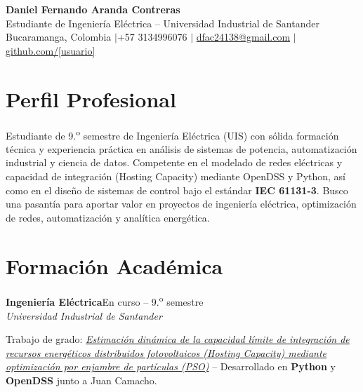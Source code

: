 \documentclass[10pt,a4paper]{article}
\newcommand{\entrada}[3]{%
    \noindent\textbf{\color{primario}#1}\hfill{\small\color{secundario}#2}\\[0pt]
    {\small\itshape\color{secundario}#3}\par\vspace{1pt}%
}
\begin{document}

\vspace{-10pt}
\begin{center}
    {\fontsize{21}{24}\selectfont\bfseries\color{primario} Daniel Fernando Aranda Contreras}\\[2pt]
    {\normalsize\color{secundario} Estudiante de Ingeniería Eléctrica -- Universidad Industrial de Santander}\\[4pt]
    {\small\color{texto}
        Bucaramanga, Colombia \quad$\vert$\quad +57 3134996076 \quad$\vert$\quad
        \href{mailto:dfac24138@gmail.com}{dfac24138@gmail.com} \quad$\vert$\quad
        \href{https://github.com/[usuario]}{github.com/[usuario]}
    }
\end{center}
\vspace{0pt}

\section*{Perfil Profesional}
Estudiante de 9.\textsuperscript{o} semestre de Ingeniería Eléctrica (UIS) con sólida formación técnica y experiencia práctica en análisis de sistemas de potencia, automatización industrial y ciencia de datos. Competente en el modelado de redes eléctricas y capacidad de integración (Hosting Capacity) mediante OpenDSS y Python, así como en el diseño de sistemas de control bajo el estándar \textbf{IEC 61131-3}. Busco una pasantía para aportar valor en proyectos de ingeniería eléctrica, optimización de redes, automatización y analítica energética.

\section*{Formación Académica}

\entrada{Ingeniería Eléctrica}{En curso -- 9.\textsuperscript{o} semestre}{Universidad Industrial de Santander}
{\small\color{texto} Trabajo de grado: \href{https://www.zotero.org/groups/6637268/camacho-aranda-tesis-uis}{\itshape Estimación dinámica de la capacidad límite de integración de recursos energéticos distribuidos fotovoltaicos (Hosting Capacity) mediante optimización por enjambre de partículas (PSO)} -- Desarrollado en \textbf{Python} y \textbf{OpenDSS} junto a Juan Camacho.}
\vspace{2pt}
\end{document}
